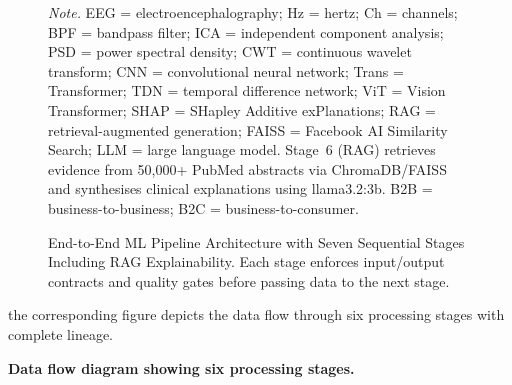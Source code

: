 \begin{figure}[!htbp]
{%
}%
\caption[ML Pipeline Architecture (7 Stages)]{End-to-End ML Pipeline Architecture with Seven Sequential Stages Including RAG Explainability. Each stage enforces input/output contracts and quality gates before passing data to the next stage.}

\vspace{0.5em}
\noindent\textit{Note.} EEG = electroencephalography; Hz = hertz; Ch = channels; BPF = bandpass filter; ICA = independent component analysis; PSD = power spectral density; CWT = continuous wavelet transform; CNN = convolutional neural network; Trans = Transformer; TDN = temporal difference network; ViT = Vision Transformer; SHAP = SHapley Additive exPlanations; RAG = retrieval-augmented generation; FAISS = Facebook AI Similarity Search; LLM = large language model. Stage~6 (RAG) retrieves evidence from 50{,}000+ PubMed abstracts via ChromaDB/FAISS and synthesises clinical explanations using llama3.2:3b. B2B = business-to-business; B2C = business-to-consumer.
\end{figure}

the corresponding figure depicts the data flow through six processing stages with complete lineage.


\noindent\textbf{Data flow diagram showing six processing stages.}

